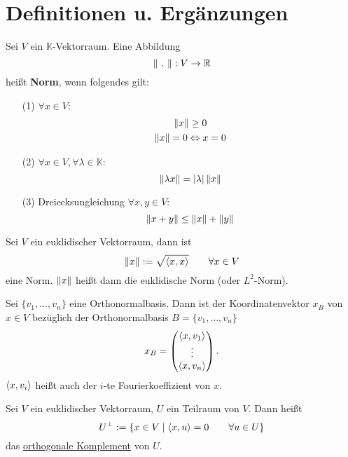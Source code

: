 \section{Definitionen u. Ergänzungen}
\begin{definition}
    [Norm] Sei $V$ ein $\mathbb{K}$-Vektorraum. Eine Abbildung
    \[
        \norm{\ .\ }:V\to\mathbb{R}    
    \]
    heißt \textbf{Norm}, wenn folgendes gilt:
    \begin{enumerate}
        \item[(1)] $\forall x \in V :$
        \begin{gather*}
            \left\lVert x \right\rVert \geq 0\\
            \left\lVert x \right\rVert = 0 \Leftrightarrow x = 0
        \end{gather*}
        \item[(2)] $\forall x\in V,\forall \lambda \in \mathbb{K}:$
        \[
            \left\lVert \lambda x \right\rVert = \vert \lambda \vert\left\lVert x \right\rVert    
        \]
        \item[(3)] Dreiecksungleichung $\forall x,y\in V :$
        \[
            \left\lVert x + y \right\rVert \leq \left\lVert x \right\rVert + \left\lVert y \right\rVert    
        \]
    \end{enumerate}
\end{definition}
\begin{definition}
     Sei $V$ ein euklidischer Vektorraum, dann ist
    \[
        \left\lVert x \right\rVert:=\sqrt{\left\langle x,x \right\rangle}\qquad\forall x\in V    
    \]
    eine Norm. $\left\lVert x \right\rVert$ heißt dann die euklidische Norm (oder $L^2$-Norm).
\end{definition}
\begin{definition}
    [Koordinatenvektor] Sei $\{v_1,\dots,v_n\}$ eine Orthonormalbasis. Dann ist der
    Koordinatenvektor $x_B$ von $x\in V$ bezüglich der Orthonormalbasis 
    $B=\{v_1,\dots,v_n\}$
    \[
        x_B = \begin{pmatrix}
            \left\langle x,v_1 \right\rangle\\
            \vdots\\
            \left\langle x,v_n \right\rangle
        \end{pmatrix}
    .\] $\left\langle x,v_i \right\rangle$ heißt auch der $i$-te Fourierkoeffizient von $x$.
\end{definition}
\begin{definition}
     Sei $V$ ein euklidischer Vektorraum, $U$ ein Teilraum
    von $V$. Dann heißt
    \[
        U^\bot := \{x\in V\mid \left\langle x,u \right\rangle=0\qquad\forall u \in U\}    
    \]
    das \underline{orthogonale Komplement} von $U$.
\end{definition}
